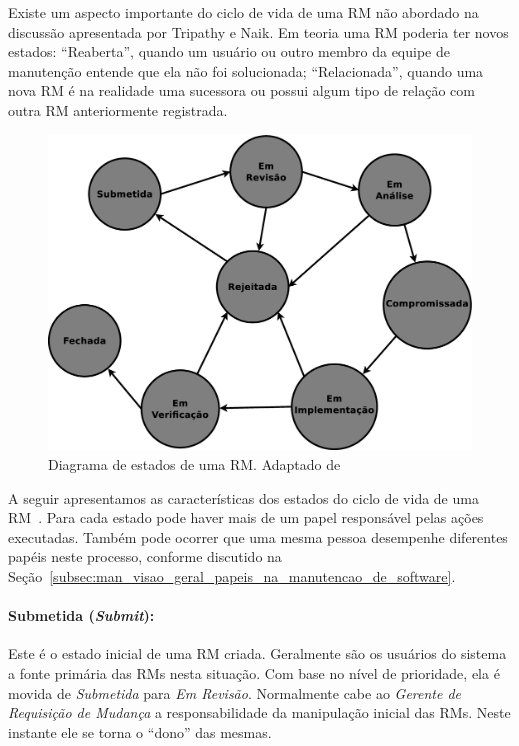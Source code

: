 Existe um aspecto importante do ciclo de vida de uma RM não abordado na
discussão apresentada por Tripathy e Naik. Em teoria uma RM poderia ter novos
estados: ``Reaberta'', quando um usuário ou outro membro da equipe de
manutenção entende que ela não foi solucionada; ``Relacionada'', quando uma
nova RM é na realidade uma sucessora ou possui algum tipo de relação com outra
RM anteriormente registrada.

\begin{figure}[htpb]
	\centering
    \includegraphics[width=0.7\linewidth]{./chapter-manutencao-software-visao-geral/img/diagrama-estado-rm.eps}
	\caption{Diagrama de estados de uma RM\@. Adaptado
		de~\cite{tripathy2014software}}\label{fig:diagrama-estado-rm}
\end{figure}

A seguir apresentamos as características dos estados do ciclo de vida de uma
RM~\cite{tripathy2014software}. Para cada estado pode haver mais de um papel
responsável pelas ações executadas. Também pode ocorrer que uma mesma pessoa
desempenhe diferentes papéis neste processo, conforme discutido na
Seção~\ref{subsec:man_visao_geral_papeis_na_manutencao_de_software}.

\paragraph{Submetida (\textit{Submit}):}\label{par:submetida)}

Este é o estado inicial de uma RM criada. Geralmente são os usuários do sistema
a fonte primária das RMs nesta situação. Com base no nível de prioridade, ela é
movida de \textit{Submetida} para \textit{Em Revisão}. Normalmente cabe ao
\textit{Gerente de Requisição de Mudança} a responsabilidade da manipulação
inicial das RMs. Neste instante ele se torna o ``dono'' das mesmas.

